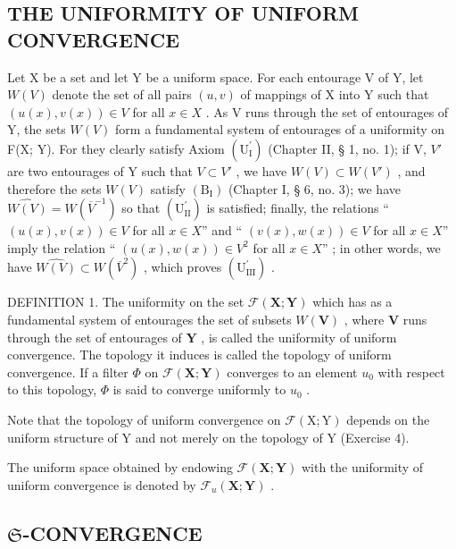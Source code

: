 \subsection{THE UNIFORMITY OF UNIFORM CONVERGENCE}

Let X be a set and let Y be a uniform space. For each entourage V of Y, let \(W(V)\) denote the set of all pairs \((u, v)\) of mappings of X into Y such that \((u(x), v(x)) \in V\) for all \(x \in X\) . As V runs through the set of entourages of Y, the sets \(W(V)\) form a fundamental system of entourages of a uniformity on F(X; Y). For they clearly satisfy Axiom \((\mathrm{U}_{\mathrm{I}}^{\prime})\) (Chapter II, § 1, no. 1); if V, \(V'\) are two entourages of Y such that \(V \subset V'\) , we have \(W(V) \subset W(V')\) , and therefore the sets \(W(V)\) satisfy \((\mathrm{B}_{\mathrm{I}})\) (Chapter I, § 6, no. 3); we have \(\widehat{W(V)} = W(\overline{V}^{-1})\) so that \((\mathrm{U}_{\mathrm{II}}^{\prime})\) is satisfied; finally, the relations `` \((u(x), v(x)) \in V\) for all \(x \in X\)'' and `` \((v(x), w(x)) \in V\) for all \(x \in X\)'' imply the relation `` \((u(x), w(x)) \in V^{2}\) for all \(x \in X\)'' ; in other words, we have \(\widehat{W(V)} \subset W(\overline{V}^{2})\) , which proves \((\mathrm{U}_{\mathrm{III}}^{\prime})\) .

DEFINITION 1. The uniformity on the set \(\mathcal{F}(\mathbf{X};\mathbf{Y})\) which has as a fundamental system of entourages the set of subsets \(W(\mathbf{V})\) , where \(\mathbf{V}\) runs through the set of entourages of \(\mathbf{Y}\) , is called the uniformity of uniform convergence. The topology it induces is called the topology of uniform convergence. If a filter \(\Phi\) on \(\mathcal{F}(\mathbf{X};\mathbf{Y})\) converges to an element \(u_0\) with respect to this topology, \(\Phi\) is said to converge uniformly to \(u_0\) .

Note that the topology of uniform convergence on \(\mathcal{F}(\mathrm{X};\mathrm{Y})\) depends on the uniform structure of Y and not merely on the topology of Y (Exercise 4).

The uniform space obtained by endowing \(\mathcal{F}(\mathbf{X};\mathbf{Y})\) with the uniformity of uniform convergence is denoted by \(\mathcal{F}_u(\mathbf{X};\mathbf{Y})\) .

\subsection{\texorpdfstring{\(\mathfrak{S}\)-CONVERGENCE}{S-CONVERGENCE}}

